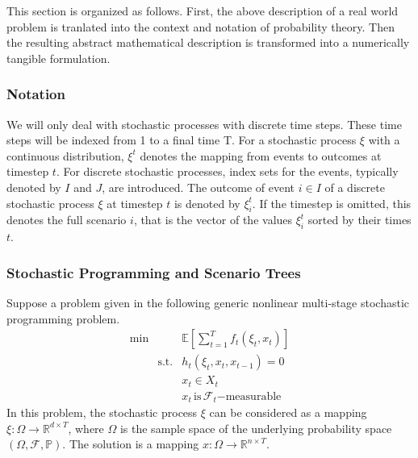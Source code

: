 \documentclass[a4paper, 12pt] {article}
\begin{document}
This section is organized as follows. First, the above description of a real world problem is tranlated into the context and notation of probability theory. Then the resulting abstract mathematical description is transformed into a numerically tangible formulation.
\subsubsection{Notation}
We will only deal with stochastic processes with discrete time steps. These time steps will be indexed from 1 to a final time T. For a stochastic process $\xi$ with a continuous distribution, $\xi^t$ denotes the mapping from events to outcomes at timestep $t$. For discrete stochastic processes, index sets for the events, typically denoted by $I$ and $J$, are introduced. The outcome of event $i\in I$ of a discrete stochastic process $\xi$ at timestep $t$ is denoted by $\xi_i^t$. If the timestep is omitted, this denotes the full scenario $i$, that is the vector of the values $\xi_i^t$ sorted by their times $t$.
\subsubsection{Stochastic Programming and Scenario Trees}
Suppose a problem given in the following generic nonlinear multi-stage stochastic programming problem. 
\begin{eqnarray}
  \label{eq:genericSP}
  \min &&\mathbb{E}\left[\sum_{t=1}^Tf_t(\xi_t, x_t)\right]\\
  &\mathrm{s.t.}& h_t(\xi_t, x_t, x_{t-1}) = 0\\
  &&x_t \in X_t\\
  &&x_t \, \mathrm{is}\,\mathcal{F}_t \mathrm{-measurable} \label{eqn:measurability-constraint}
\end{eqnarray}
In this problem, the stochastic process $\xi$ can be considered as a mapping $\xi:\Omega\rightarrow \mathbb{R}^{d\times T}$, where $\Omega$ is the sample space of the underlying probability space $(\Omega, \mathcal{F}, \mathbb{P})$. The solution is a mapping $x:\Omega\rightarrow \mathbb{R}^{n\times T}$.
 
\end{document}
